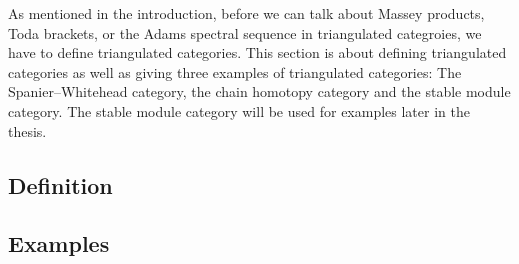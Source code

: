As mentioned in the introduction, before we can talk about Massey products, Toda brackets, or the Adams spectral sequence in triangulated categroies, we have to define triangulated categories. This section is about defining triangulated categories as well as giving three examples of triangulated categories: The Spanier--Whitehead category, the chain homotopy category and the stable module category. The stable module category will be used for examples later in the thesis.

\subsection{Definition}


\subsection{Examples}
